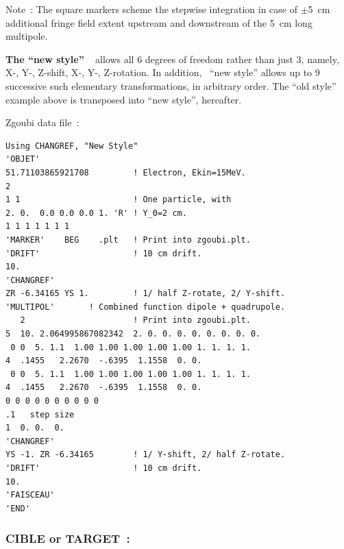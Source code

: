 {\begin{minipage}{1.\linewidth}
\begin{minipage}{.35\linewidth}
Note~: The square markers scheme the stepwise integration in case of $\pm$5~cm additional fringe field 
extent upstream and downstream of the 5~cm long multipole. 
\end{minipage}
\end{minipage}




\bigskip

\noindent \textbf{The ``new style'' \CHANGREF}~ \label{CHANGREFNew}   
    allows all 6 degrees of freedom rather than just 3, namely, X-, Y-, Z-shift, X-, Y-, Z-rotation.  
In addition, \CHANGREF\  ``new style''  allows up to 9 successive such elementary transformations,  in arbitrary order. 
The ``old style'' example above is transposed into  ``new style'',  hereafter. 

\medskip

\begin{minipage}{1.\linewidth}

 Zgoubi data file~: 

\footnotesize
\begin{verbatim}
Using CHANGREF, "New Style"
'OBJET'
51.71103865921708         ! Electron, Ekin=15MeV.
2
1 1                       ! One particle, with
2. 0.  0.0 0.0 0.0 1. 'R' ! Y_0=2 cm. 
1 1 1 1 1 1 1 
'MARKER'    BEG    .plt   ! Print into zgoubi.plt.
'DRIFT'                   ! 10 cm drift.
10.
'CHANGREF'  
ZR -6.34165 YS 1.         ! 1/ half Z-rotate, 2/ Y-shift.
'MULTIPOL'       ! Combined function dipole + quadrupole.
   2                      ! Print into zgoubi.plt.
5  10. 2.064995867082342  2. 0. 0. 0. 0. 0. 0. 0. 0.
 0 0  5. 1.1  1.00 1.00 1.00 1.00 1.00 1. 1. 1. 1.                              
4  .1455   2.2670  -.6395  1.1558  0. 0.  
 0 0  5. 1.1  1.00 1.00 1.00 1.00 1.00 1. 1. 1. 1.                              
4  .1455   2.2670  -.6395  1.1558  0. 0.  
0 0 0 0 0 0 0 0 0 0
.1   step size
1  0. 0.  0.
'CHANGREF'
YS -1. ZR -6.34165        ! 1/ Y-shift, 2/ half Z-rotate.
'DRIFT'                   ! 10 cm drift.
10.
'FAISCEAU'
'END'
\end{verbatim}
\end{minipage}







\newpage

\subsubsection*{CIBLE or TARGET~: \CIBLETitl}
\label{CIBLE}\label{TARGET}
 
\medskip

}
